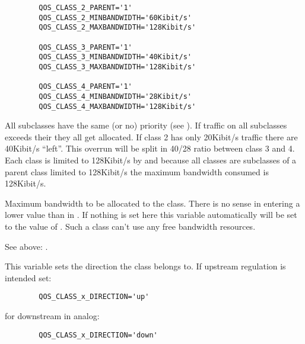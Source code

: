 \begin{description}
\begin{example}
\begin{verbatim}
        QOS_CLASS_2_PARENT='1'
        QOS_CLASS_2_MINBANDWIDTH='60Kibit/s'
        QOS_CLASS_2_MAXBANDWIDTH='128Kibit/s'

        QOS_CLASS_3_PARENT='1'
        QOS_CLASS_3_MINBANDWIDTH='40Kibit/s'
        QOS_CLASS_3_MAXBANDWIDTH='128Kibit/s'

        QOS_CLASS_4_PARENT='1'
        QOS_CLASS_4_MINBANDWIDTH='28Kibit/s'
        QOS_CLASS_4_MAXBANDWIDTH='128Kibit/s'
\end{verbatim}
\end{example}


   All subclasses have the same (or no) priority (see ).
   If traffic on all subclasses exceeds their 
   they all get  allocated.
   If class 2 has only 20Kibit/s traffic there are 40Kibit/s ``left''. This overrun
   will be split in 40/28 ratio between class 3 and 4.
   Each class is limited to 128Kibit/s by 
   and because all classes are subclasses of a parent class limited to 128Kibit/s
   the maximum bandwidth consumed is 128Kibit/s.



   Maximum bandwidth to be allocated to the class. There is no sense in entering
   a lower value than in . If nothing
   is set here this variable automatically will be set to the value of
   . Such a class can't use any free
   bandwidth resources.

   See above: .



   This variable sets the direction the class belongs to. If upstream regulation
   is intended set:

\begin{example}
\begin{verbatim}
        QOS_CLASS_x_DIRECTION='up'
\end{verbatim}
\end{example}

   for downstream in analog:

\begin{example}
\begin{verbatim}
        QOS_CLASS_x_DIRECTION='down'
\end{verbatim}
\end{example}



\end{description}
